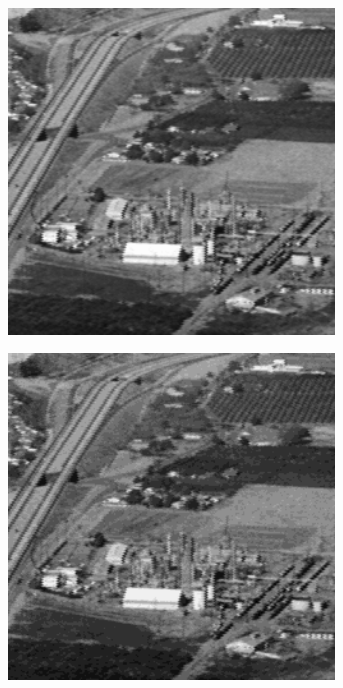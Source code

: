 \begin{figure}
\begin{subfigure}[b]{.23\textwidth}
  \caption{}
  \label{fig:test-images-chemicalplant}
\end{subfigure}
\begin{subfigure}[b]{.23\textwidth}
  \centering
  \includegraphics[width=0.95\textwidth]{figures/test-images/truncate2/chemicalplant}
  \caption{}
  \label{fig:test-images-chemicalplant}
\end{subfigure}
\begin{subfigure}[b]{.23\textwidth}
  \centering
  \includegraphics[width=0.95\textwidth]{figures/test-images/truncate4/chemicalplant}
  \caption{}
  \label{fig:test-images-chemicalplant}
\end{subfigure}


\end{figure}

